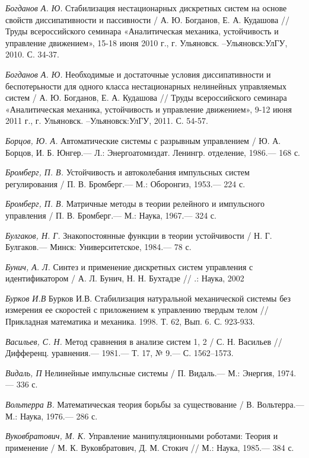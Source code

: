 \begin{thebibliography}{10}
	{\it Богданов А. Ю.} Стабилизация нестационарных дискретных систем на основе свойств диссипативности и пассивности / А. Ю. Богданов, Е. А. Кудашова //
	Труды всероссийского семинара «Аналитическая механика, устойчивость и управление движением», 15-18 июня 2010 г., г. Ульяновск. –Ульяновск:УлГУ, 2010. С. 34-37.
	
	{\it Богданов А. Ю.} Необходимые и достаточные условия диссипативности и беспотерьности для одного класса нестационарных нелинейных управляемых систем / А. Ю. Богданов, Е. А. Кудашова //
	Труды всероссийского семинара «Аналитическая механика, устойчивость и управление движением», 9-12 июня 2011 г., г. Ульяновск. –Ульяновск:УлГУ, 2011. С. 54-57.
	
	
	{\it Борцов, Ю. А.} Автоматические системы с разрывным управлением / Ю. А. Борцов,
	И. Б. Юнгер.— Л.: Энергоатомиздат. Ленингр. отделение, 1986.— 168 с.
	
	{\it Бромберг, П. В.} Устойчивость и автоколебания импульсных систем регулирования /
	П. В. Бромберг.— М.: Оборонгиз, 1953.— 224 с.
	
	{\it Бромберг, П. В.} Матричные методы в теории релейного и импульсного управления /
	П. В. Бромберг.— М.: Наука, 1967.— 324 с.
	
	{\it Булгаков, Н. Г.} Знакопостоянные функции в теории устойчивости /
	Н. Г. Булгаков.— Минск: Университетское, 1984.— 78 с.
	
	{\it Бунич, А. Л.} Синтез и применение дискретных систем управления с идентификатором /
	А. Л. Бунич, Н. Н. Бухтадзе // .: Наука, 2002
	
	{\it Бурков И.В} Бурков И.В. Стабилизация натуральной механической системы без измерения ее скоростей с приложением к управлению твердым телом // Прикладная математика и механика. 1998. Т. 62, Вып. 6. С. 923-933.
	
	{\it Васильев, С. Н.} Метод сравнения в анализе систем 1, 2 / С. Н. Васильев // Дифференц.
	уравнения.— 1981.— Т. 17, № 9.— С. 1562–1573.
	
	{\it Видаль, П} Нелинейные импульсные системы / П. Видаль.— М.: Энергия, 1974.— 336 с.
	
	{\it Вольтерра В.} Математическая теория борьбы за существование /
	В. Вольтерра.— М.: Наука, 1976.— 286 с.
	
	{\it Вуковбратович, М. К.} Управление манипуляционными роботами: Теория и применение /
	М. К. Вуковбратович, Д. М. Стокич // М.: Наука, 1985.— 384 с.
	

\end{thebibliography}
